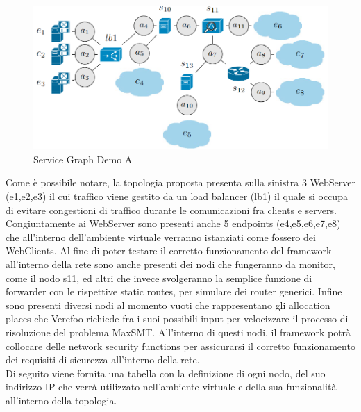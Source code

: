 \begin{figure}[h]  %
    \centering
    \includegraphics[width=1\textwidth]{VPN_AG.PNG} 
    \caption{Service Graph Demo A}
    \label{fig:ServiceGraph}
\end{figure}
Come è possibile notare, la topologia proposta presenta sulla sinistra 3 WebServer (e1,e2,e3) il cui traffico viene gestito da un load balancer (lb1) il quale si occupa di evitare congestioni di traffico durante le comunicazioni fra clients e servers. 
Congiuntamente ai WebServer sono presenti anche 5 endpoints (e4,e5,e6,e7,e8) che all'interno dell'ambiente virtuale verranno istanziati come fossero dei WebClients. 
Al fine di poter testare il corretto funzionamento del framework all'interno della rete sono anche presenti dei nodi che fungeranno da monitor, come il nodo  s11, ed altri che invece svolgeranno la semplice funzione di forwarder con le rispettive static routes, per simulare dei router generici. 
Infine sono presenti diversi nodi al momento vuoti che rappresentano gli  allocation places che Verefoo richiede fra i suoi possibili input per velocizzare il processo di risoluzione del problema MaxSMT. All'interno di questi nodi, il framework potrà collocare delle network security functions per assicurarsi 
il corretto funzionamento dei requisiti di sicurezza all'interno della rete.\\ Di seguito viene fornita una tabella con la definizione di ogni nodo, del suo indirizzo IP che verrà utilizzato nell'ambiente virtuale e della sua funzionalità all'interno della topologia. \\

